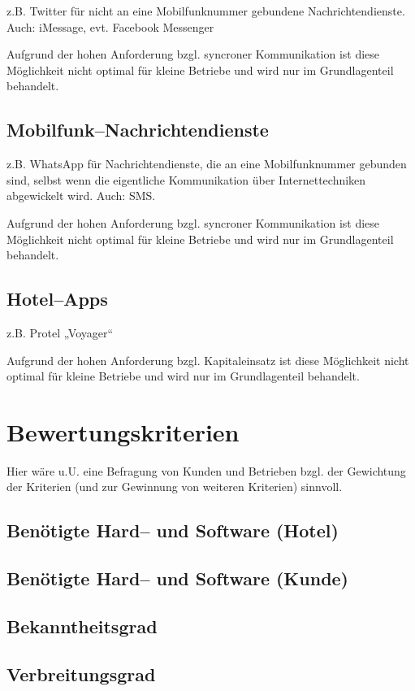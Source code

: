 z.B. Twitter für nicht an eine Mobilfunknummer gebundene Nachrichtendienste. Auch: iMessage, evt. Facebook Messenger

Aufgrund der hohen Anforderung bzgl. syncroner Kommunikation ist diese Möglichkeit nicht optimal für kleine Betriebe und wird nur im Grundlagenteil behandelt.

\subsection{Mobilfunk--Nachrichtendienste}

z.B. WhatsApp für Nachrichtendienste, die an eine Mobilfunknummer gebunden sind, selbst wenn die eigentliche Kommunikation über Internettechniken abgewickelt wird. Auch: SMS.

Aufgrund der hohen Anforderung bzgl. syncroner Kommunikation ist diese Möglichkeit nicht optimal für kleine Betriebe und wird nur im Grundlagenteil behandelt.

\subsection{Hotel--Apps}

z.B. Protel „Voyager“

Aufgrund der hohen Anforderung bzgl. Kapitaleinsatz ist diese Möglichkeit nicht optimal für kleine Betriebe und wird nur im Grundlagenteil behandelt.

\section{Bewertungskriterien}
\label{sec:kriterien}

Hier wäre u.U. eine Befragung von Kunden und Betrieben bzgl. der Gewichtung der Kriterien (und zur Gewinnung von weiteren Kriterien) sinnvoll.

\subsection{Benötigte Hard-- und Software (Hotel)}
\subsection{Benötigte Hard-- und Software (Kunde)}
\subsection{Bekanntheitsgrad}
\subsection{Verbreitungsgrad}
